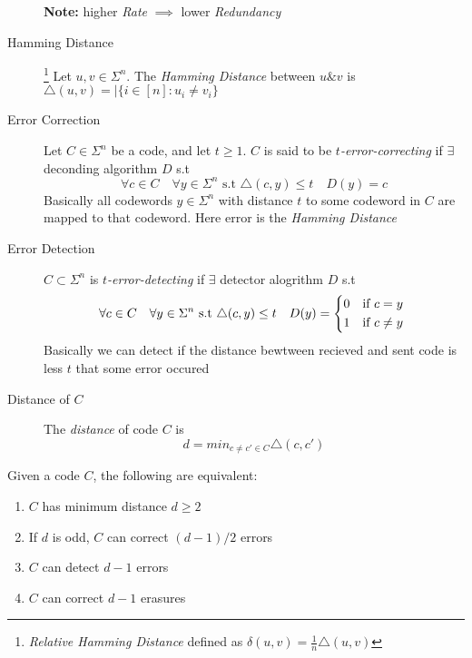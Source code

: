 \begin{description}
        \textbf{Note:} higher \textit{Rate} $\implies$ lower \textit{Redundancy}
    \item[Hamming Distance]
        \footnote{\textit{Relative Hamming Distance} defined as $\delta(u, v) = \frac{1}{n}\triangle(u, v)$}
        Let $u, v \in \Sigma^n$. 
        The \textit{Hamming Distance} between $u \& v$ is $\triangle(u, v) = |\{i \in [n]: u_i \neq v_i\}$
    \item[Error Correction] Let $C \in \Sigma^n$ be a code, and let $t \geq 1$. $C$ is said to be \textit{$t$-error-correcting} if $\exists$ deconding algorithm $D$ s.t
        \[
           \forall c \in C \quad \forall y \in \Sigma^n \text{ s.t } \triangle(c, y) \leq t \quad D(y) = c
        \]
        Basically all codewords $y \in \Sigma^n$ with distance $t$ to some codeword in $C$ are mapped to that codeword. 
        Here error is the \textit{Hamming Distance}
    \item[Error Detection] $C \subset \Sigma^n$ is \textit{$t$-error-detecting} if $\exists$ detector alogrithm $D$ s.t
        \[
            \forall c \in C \quad \forall y \in \Sigma^n \text{ s.t } \triangle(c,y) \leq t \quad D(y) = 
            \begin{cases*}
                0 & if $c = y$ \\
                1 & if $c \neq y$
            \end{cases*}
        \]
        Basically we can detect if the distance bewtween recieved and sent code is less $t$ that some error occured
    \item[Distance of $C$] The \textit{distance} of code $C$ is
        \[
            d = min_{c \neq c' \in C}\triangle(c, c')
        \]
\end{description}

\begin{theorem}
    Given a code $C$, the following are equivalent:
    \begin{enumerate}
        \item $C$ has minimum distance $d \geq 2$
        \item If $d$ is odd, $C$ can correct $(d - 1) / 2$ errors
        \item $C$ can detect $d - 1$ errors
        \item $C$ can correct $d - 1$ erasures
    \end{enumerate}
\end{theorem}
